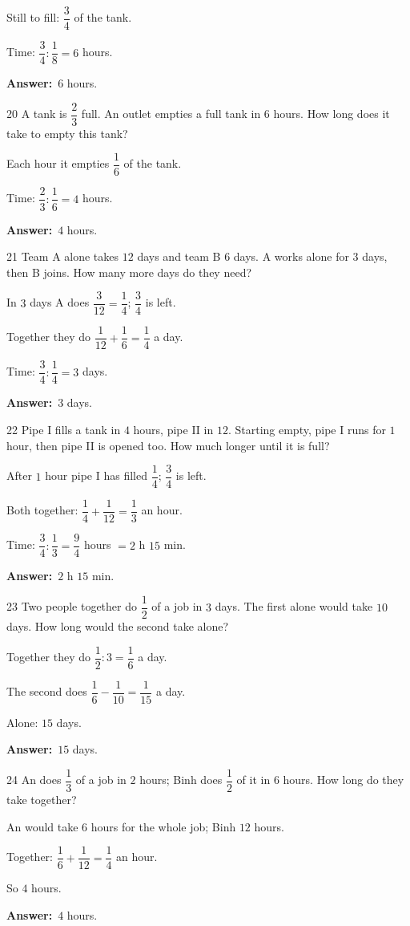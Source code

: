 \documentclass[11pt]{article}
\newif\ifsol \solfalse
\providecommand{\AnsWord}{Đáp số}
\newcommand{\dapso}[1]{\par\textbf{\AnsWord:}\ #1}
\newcommand{\probsol}[1]{%
  \begin{lrbox}{\solmeasure}\begin{minipage}{\dimexpr\linewidth-24pt\relax}#1\end{minipage}\end{lrbox}%
  \ifsol
    \begin{solbox}#1\end{solbox}%
  \else
    \setlength{\solht}{\dimexpr\ht\solmeasure+\dp\solmeasure+0.85cm\relax}%
    \ifdim\solht<1.35cm\setlength{\solht}{1.35cm}\fi
    \begin{tcolorbox}[colback=white,colframe=Line,boxrule=0.8pt,arc=5pt,
      left=8pt,right=8pt,top=4pt,bottom=4pt,height=\solht]{\footnotesize\color{Slate}\itshape\WorkWord}\end{tcolorbox}%
  \fi}
\newcommand{\gap}{\vspace{0.3cm}}
\def\WorkWord{Your work:}
\def\AnsWord{Answer}
\begin{document}
\probsol{
Still to fill: $\dfrac34$ of the tank.\par Time: $\dfrac34:\dfrac18=6$ hours.
\dapso{$6$ hours.}}
\gap
\begin{probbox}{20}{\relax}
A tank is $\dfrac23$ full. An outlet empties a full tank in $6$ hours. How long does it take to empty this tank?
\end{probbox}
\probsol{
Each hour it empties $\dfrac16$ of the tank.\par Time: $\dfrac23:\dfrac16=4$ hours.
\dapso{$4$ hours.}}
\gap
\begin{probbox}{21}{\relax}
Team A alone takes $12$ days and team B $6$ days. A works alone for $3$ days, then B joins. How many more days do they need?
\end{probbox}
\probsol{
In $3$ days A does $\dfrac3{12}=\dfrac14$; $\dfrac34$ is left.\par Together they do $\dfrac1{12}+\dfrac16=\dfrac14$ a day.\par Time: $\dfrac34:\dfrac14=3$ days.
\dapso{$3$ days.}}
\gap
\begin{probbox}{22}{\relax}
Pipe I fills a tank in $4$ hours, pipe II in $12$. Starting empty, pipe I runs for $1$ hour, then pipe II is opened too. How much longer until it is full?
\end{probbox}
\probsol{
After $1$ hour pipe I has filled $\dfrac14$; $\dfrac34$ is left.\par Both together: $\dfrac14+\dfrac1{12}=\dfrac13$ an hour.\par Time: $\dfrac34:\dfrac13=\dfrac94$ hours $=2$ h $15$ min.
\dapso{$2$ h $15$ min.}}
\gap
\begin{probbox}{23}{\relax}
Two people together do $\dfrac12$ of a job in $3$ days. The first alone would take $10$ days. How long would the second take alone?
\end{probbox}
\probsol{
Together they do $\dfrac12:3=\dfrac16$ a day.\par The second does $\dfrac16-\dfrac1{10}=\dfrac1{15}$ a day.\par Alone: $15$ days.
\dapso{$15$ days.}}
\gap
\begin{probbox}{24}{\relax}
An does $\dfrac13$ of a job in $2$ hours; Binh does $\dfrac12$ of it in $6$ hours. How long do they take together?
\end{probbox}
\probsol{
An would take $6$ hours for the whole job; Binh $12$ hours.\par Together: $\dfrac16+\dfrac1{12}=\dfrac14$ an hour.\par So $4$ hours.
\dapso{$4$ hours.}}
\end{document}

